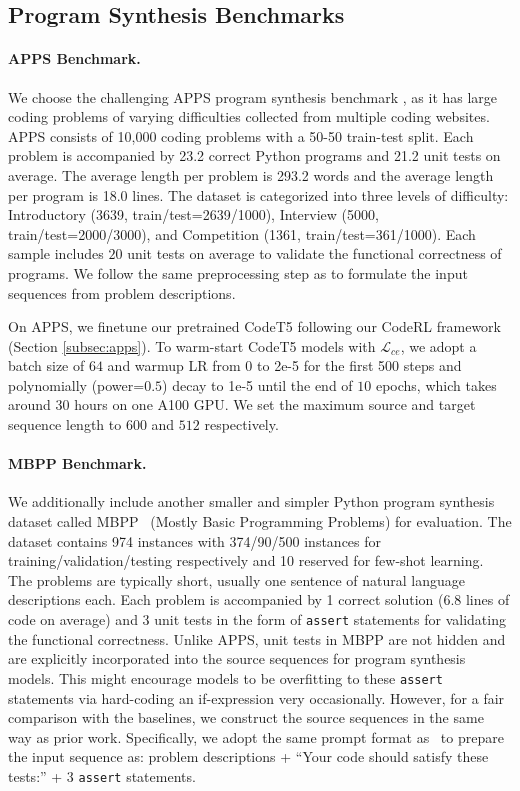 \documentclass{article}
\begin{document}
\subsection{Program Synthesis Benchmarks}

\paragraph{APPS Benchmark.}
We choose the challenging APPS program synthesis benchmark \citep{hendrycksapps2021}, as it has large coding problems of varying difficulties collected from multiple coding websites. 
APPS consists of 10,000 coding problems with a 50-50 train-test split. Each problem is accompanied by 23.2 correct Python programs and 21.2 unit tests on average. The average length per problem is 293.2 words and the average length per program is 18.0 lines. The dataset is categorized into three levels of difficulty: Introductory (3639, train/test=2639/1000), Interview (5000, train/test=2000/3000), and Competition (1361, train/test=361/1000). 
Each sample includes $20$ unit tests on average to validate the functional correctness of programs. 
We follow the same preprocessing step as \citep{hendrycksapps2021} to formulate the input sequences from problem descriptions.


On APPS, we finetune our pretrained CodeT5 following our CodeRL framework (Section \ref{subsec:apps}).
To warm-start CodeT5 models with $\mathcal{L}_{ce}$, we adopt a batch size of $64$ and warmup LR from 0 to 2e-5 for the first 500 steps and polynomially (power=$0.5$) decay to 1e-5 until the end of $10$ epochs, which takes around $30$ hours on one A100 GPU. We set the maximum source and target sequence length to $600$ and $512$ respectively.

\paragraph{MBPP Benchmark.}
We additionally include another smaller and simpler Python program synthesis dataset called MBPP~\citep{austin2021program} (Mostly Basic Programming Problems) for evaluation. The dataset contains 974 instances with 374/90/500 instances for training/validation/testing respectively and 10 reserved for few-shot learning. 
The problems are typically short, usually one sentence of natural language descriptions each.
Each problem is accompanied by 1 correct solution (6.8 lines of code on average) and 3 unit tests in the form of \texttt{assert} statements for validating the functional correctness. Unlike APPS, unit tests in MBPP are not hidden and are explicitly incorporated into the source sequences for program synthesis models. 
This might encourage models to be overfitting to these \texttt{assert} statements via hard-coding an if-expression very occasionally.
However, for a fair comparison with the baselines, we construct the source sequences in the same way as prior work. Specifically, we adopt the same prompt format as~\citep{austin2021program} to prepare the input sequence as: problem descriptions + ``Your code should satisfy these tests:'' + 3 \texttt{assert} statements.
\end{document}
